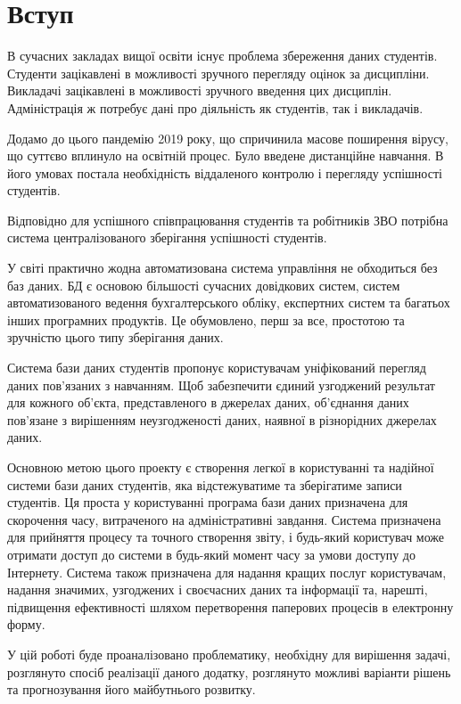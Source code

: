 \documentclass[14pt,a4paper,oneside]{extbook}
\begin{document}

\setcounter{page}{1}
\tableofcontents
\chapter{Вступ}
	В сучасних закладах вищої освіти існує проблема збереження даних студентів. Студенти зацікавлені в можливості зручного перегляду оцінок за дисципліни. Викладачі зацікавлені в можливості зручного введення цих дисциплін. Адміністрація ж потребує дані про діяльність як студентів, так і викладачів.
	
	Додамо до цього пандемію 2019 року, що спричинила масове поширення вірусу, що суттєво вплинуло на освітній процес. Було введене дистанційне навчання. В його умовах постала необхідність віддаленого контролю і перегляду успішності студентів.

	Відповідно для успішного співпрацювання студентів та робітників ЗВО потрібна система централізованого зберігання успішності студентів.

	У світі практично жодна автоматизована система управління не обходиться без баз даних. БД є основою більшості сучасних довідкових систем, систем автоматизованого ведення бухгалтерського обліку, експертних систем та багатьох інших програмних продуктів. Це обумовлено, перш за все, простотою та зручністю цього типу зберігання даних. 

	Система бази даних студентів пропонує користувачам уніфікований перегляд даних пов'язаних з навчанням. Щоб забезпечити єдиний узгоджений результат для кожного об’єкта, представленого в джерелах даних, об’єднання даних пов’язане з вирішенням неузгодженості даних, наявної в різнорідних джерелах даних. 

	Основною метою цього проекту є створення легкої в користуванні та надійної системи бази даних студентів, яка відстежуватиме та зберігатиме записи студентів. Ця проста у користуванні програма бази даних призначена для скорочення часу, витраченого на адміністративні завдання. Система призначена для прийняття процесу та точного створення звіту, і будь-який користувач може отримати доступ до системи в будь-який момент часу за умови доступу до Інтернету. Система також призначена для надання кращих послуг користувачам, надання значимих, узгоджених і своєчасних даних та інформації та, нарешті, підвищення ефективності шляхом перетворення паперових процесів в електронну форму.

	У цій роботі буде проаналізовано проблематику, необхідну для вирішення задачі, розглянуто спосіб реалізації даного додатку, розглянуто можливі варіанти рішень та прогнозування його майбутнього розвитку.
\end{document}
